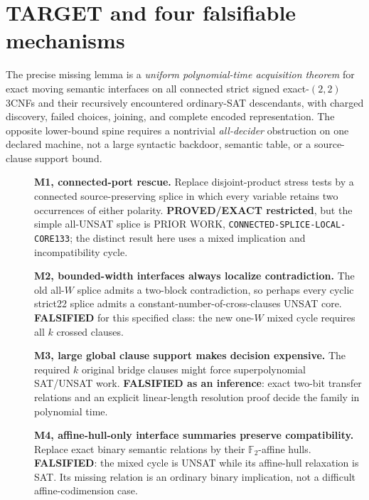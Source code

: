 \documentclass[10pt]{article}
\newcommand{\FF}{\mathbb F_2}
\begin{document}
\section{TARGET and four falsifiable mechanisms}
The precise missing lemma is a \emph{uniform polynomial-time acquisition theorem} for exact moving semantic interfaces on all connected strict signed exact-$(2,2)$ 3CNFs and their recursively encountered ordinary-SAT descendants, with charged discovery, failed choices, joining, and complete encoded representation. The opposite lower-bound spine requires a nontrivial \emph{all-decider} obstruction on one declared machine, not a large syntactic backdoor, semantic table, or a source-clause support bound.
\begin{description}
\item[]\textbf{M1, connected-port rescue.} Replace disjoint-product stress tests by a connected source-preserving splice in which every variable retains two occurrences of either polarity. \textbf{PROVED/EXACT restricted}, but the simple all-UNSAT splice is PRIOR WORK, \texttt{CONNECTED-SPLICE-LOCAL-CORE133}; the distinct result here uses a mixed implication and incompatibility cycle.
\item[]\textbf{M2, bounded-width interfaces always localize contradiction.} The old all-$W$ splice admits a two-block contradiction, so perhaps every cyclic strict22 splice admits a constant-number-of-cross-clauses UNSAT core. \textbf{FALSIFIED} for this specified class: the new one-$W$ mixed cycle requires all $k$ crossed clauses.
\item[]\textbf{M3, large global clause support makes decision expensive.} The required $k$ original bridge clauses might force superpolynomial SAT/UNSAT work. \textbf{FALSIFIED as an inference}: exact two-bit transfer relations and an explicit linear-length resolution proof decide the family in polynomial time.
\item[]\textbf{M4, affine-hull-only interface summaries preserve compatibility.} Replace exact binary semantic relations by their $\FF$-affine hulls. \textbf{FALSIFIED}: the mixed cycle is UNSAT while its affine-hull relaxation is SAT. Its missing relation is an ordinary binary implication, not a difficult affine-codimension case.
\end{description}
\end{document}

